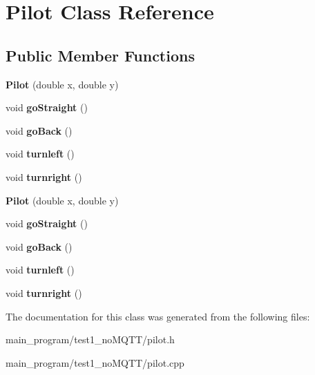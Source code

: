 \hypertarget{class_pilot}{}\section{Pilot Class Reference}
\label{class_pilot}
\subsection*{Public Member Functions}
\begin{DoxyCompactItemize}
\item 
{\bfseries Pilot} (double x, double y)\hypertarget{class_pilot_ac6ff56d0c140449d7f75ef49b77814bc}{}\label{class_pilot_ac6ff56d0c140449d7f75ef49b77814bc}

\item 
void {\bfseries go\+Straight} ()\hypertarget{class_pilot_abad3861ed2473f5e4c334f038a642c55}{}\label{class_pilot_abad3861ed2473f5e4c334f038a642c55}

\item 
void {\bfseries go\+Back} ()\hypertarget{class_pilot_a59be9cbc9f05aeefe37caa4a57fb90aa}{}\label{class_pilot_a59be9cbc9f05aeefe37caa4a57fb90aa}

\item 
void {\bfseries turnleft} ()\hypertarget{class_pilot_ac596f29cbed2c40dff28e3515e1410a6}{}\label{class_pilot_ac596f29cbed2c40dff28e3515e1410a6}

\item 
void {\bfseries turnright} ()\hypertarget{class_pilot_a10dd1174193c804401d1d3e1c6c5ddff}{}\label{class_pilot_a10dd1174193c804401d1d3e1c6c5ddff}

\item 
{\bfseries Pilot} (double x, double y)\hypertarget{class_pilot_ac6ff56d0c140449d7f75ef49b77814bc}{}\label{class_pilot_ac6ff56d0c140449d7f75ef49b77814bc}

\item 
void {\bfseries go\+Straight} ()\hypertarget{class_pilot_abad3861ed2473f5e4c334f038a642c55}{}\label{class_pilot_abad3861ed2473f5e4c334f038a642c55}

\item 
void {\bfseries go\+Back} ()\hypertarget{class_pilot_a59be9cbc9f05aeefe37caa4a57fb90aa}{}\label{class_pilot_a59be9cbc9f05aeefe37caa4a57fb90aa}

\item 
void {\bfseries turnleft} ()\hypertarget{class_pilot_ac596f29cbed2c40dff28e3515e1410a6}{}\label{class_pilot_ac596f29cbed2c40dff28e3515e1410a6}

\item 
void {\bfseries turnright} ()\hypertarget{class_pilot_a10dd1174193c804401d1d3e1c6c5ddff}{}\label{class_pilot_a10dd1174193c804401d1d3e1c6c5ddff}

\end{DoxyCompactItemize}


The documentation for this class was generated from the following files\+:\begin{DoxyCompactItemize}
\item 
main\+\_\+program/test1\+\_\+no\+M\+Q\+T\+T/pilot.\+h\item 
main\+\_\+program/test1\+\_\+no\+M\+Q\+T\+T/pilot.\+cpp\end{DoxyCompactItemize}
